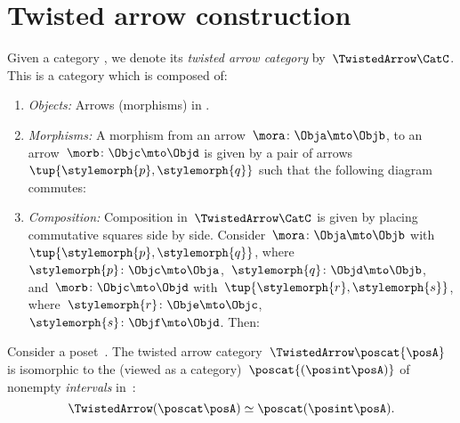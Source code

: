 
\section{Twisted arrow construction}
\begin{ctdefinition}
    \label{def:twisted-arrow-category}
    \label{def:twisted-arrow}
    Given a category \CatC, we denote its \emph{twisted arrow category} by~$\TwistedArrow\CatC$.
    This is a category which is composed of:
    \begin{enumerate}
        \item \emph{Objects:} Arrows (morphisms) in \CatC.
        \item \emph{Morphisms:}
              A morphism from an arrow~$\mora\colon \Obja \mto \Objb $, to an arrow~$\morb\colon \Objc \mto \Objd$ is given by a pair of arrows~$\tup{\stylemorph{p},\stylemorph{q}}$ such that the following diagram commutes:
        \item \emph{Composition:} Composition in~$\TwistedArrow\CatC$ is given by placing commutative squares side by side.
              Consider~$\mora\colon \Obja \mto \Objb$ with~$\tup{\stylemorph{p},\stylemorph{q}}$, where~$\stylemorph{p}\colon \Objc\mto \Obja$,~$\stylemorph{q}\colon \Objd \mto \Objb$, and~$\morb\colon \Objc \mto \Objd$ with~$\tup{\stylemorph{r},\stylemorph{s}}$, where~$\stylemorph{r}\colon \Obje\mto \Objc$,~$\stylemorph{s}\colon \Objf \mto \Objd$.
              Then:
    \end{enumerate}
\end{ctdefinition}


\begin{example}
    \label{exa:twisted-arrow-poset}
    Consider a poset~\posA.
    The twisted arrow category~$\TwistedArrow \poscat{\posA}$ is isomorphic to the  (viewed as a category)~$\poscat{\left(\posint\posA\right)}$ of nonempty \emph{intervals} in~\posA:
    \begin{equation}
        \TwistedArrow (\poscat \posA) \simeq \poscat (\posint\posA) .
    \end{equation}
\end{example}

